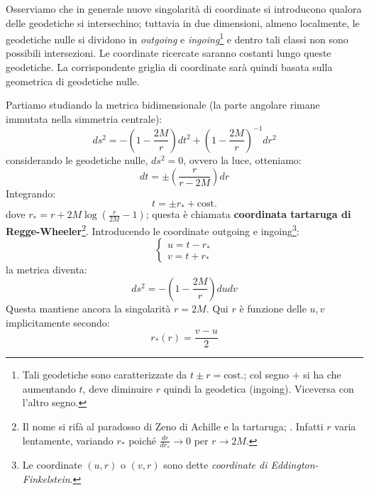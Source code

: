 Osserviamo che in generale nuove singolarità di coordinate si introducono qualora delle geodetiche si intersechino; tuttavia in due dimensioni, almeno localmente, le geodetiche nulle si dividono in \emph{outgoing} e \emph{ingoing}\footnote{Tali geodetiche sono caratterizzate da $t\pm r = \textrm{cost.}$; col segno $+$ si ha che aumentando $t$, deve diminuire $r$ quindi la geodetica  (ingoing). Viceversa con l'altro segno.} e dentro tali classi non sono possibili intersezioni. Le coordinate ricercate saranno costanti lungo queste geodetiche. La corrispondente griglia di coordinate sarà quindi basata sulla geometrica  di geodetiche nulle.

Partiamo studiando la metrica bidimensionale (la parte angolare rimane immutata nella simmetria centrale):
\begin{equation*}
    ds^2 = - \left( 1 - \frac{2M}{r}\right) dt^2 +  \left( 1 - \frac{2M}{r}\right)^{-1} dr^2
\end{equation*}
considerando le geodetiche nulle, $ds^2=0$, ovvero la luce, otteniamo:
\begin{equation*}
    dt =  \pm \left( \frac{r}{r-2M}\right) dr
\end{equation*}
Integrando:
\begin{equation*}
    t = \pm r_* + \textrm{cost.}
\end{equation*}
dove $r_* = r+2M\log(\frac{r}{2M}-1)$; questa è chiamata \textbf{coordinata tartaruga di Regge-Wheeler}\footnote{Il nome si rifà al paradosso di Zeno di Achille e la tartaruga; . Infatti $r$ varia lentamente, variando $r_*$ poiché $\frac{dr}{dr_*}\rightarrow 0$ per $r\rightarrow2M$.}. Introducendo le coordinate outgoing e ingoing\footnote{Le coordinate  $(u,r)$ o $(v,r)$ sono dette \emph{coordinate di Eddington-Finkelstein}.}:
\begin{equation*}
    \left\{\begin{array}{c}
         u = t - r_* \\
         v = t + r_*
    \end{array}\right.
\end{equation*}
la metrica diventa:
\begin{equation*}
    ds^2 = -  \left( 1 - \frac{2M}{r}\right)dudv
\end{equation*}
Questa mantiene ancora la singolarità $r=2M$. Qui $r$ è funzione delle $u, v$ implicitamente secondo:
\begin{equation*}
    r_*(r)= \frac{v-u}{2}
\end{equation*}
